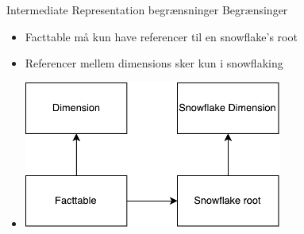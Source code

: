 \begin{frame}{Intermediate Representation begrænsninger}{}
  Begrænsinger
  \begin{itemize}
    \item<1-> Facttable må kun have referencer til en snowflake’s root
    \item<2-> Referencer mellem dimensions sker kun i snowflaking
    \item<3->[] \includegraphics[width=8.5cm]{figures/IRLimitations.pdf}
  \end{itemize}
\end{frame}
